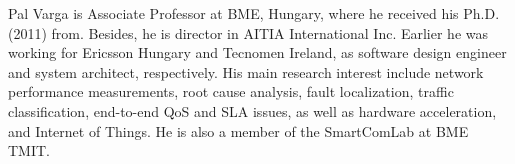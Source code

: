 \documentclass[journal]{IEEEtran}
\begin{document}
\begin{IEEEbiography}{Pal Varga}
 is Associate Professor at BME, Hungary, where he received his Ph.D. (2011) from. Besides, he is director in AITIA International Inc. Earlier he was working for Ericsson Hungary and Tecnomen Ireland, as software design engineer and system architect, respectively. His main research interest include network performance measurements, root cause analysis, fault localization, traffic classification, end-to-end QoS and SLA issues, as well as hardware acceleration, and Internet of Things. He is also a member of the SmartComLab at BME TMIT.

\end{IEEEbiography}




%
%

%

%
%
\end{document}

